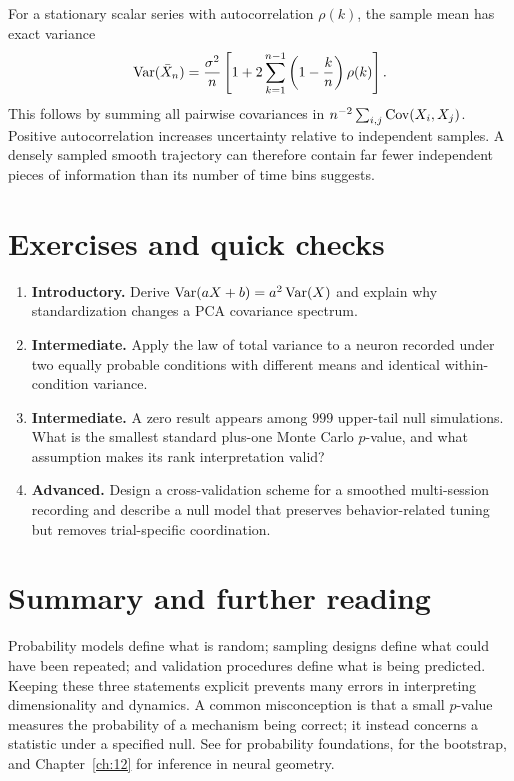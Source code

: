 For a stationary scalar series with autocorrelation \(\rho(k)\), the sample mean has exact variance
\[
\operatorname{Var}(\bar X_n)=\frac{\sigma^2}{n}
\left[1+2\sum_{k=1}^{n-1}\left(1-\frac{k}{n}\right)\rho(k)\right].
\]
This follows by summing all pairwise covariances in \(n^{-2}\sum_{i,j}\operatorname{Cov}(X_i,X_j)\). Positive autocorrelation increases uncertainty relative to independent samples. A densely sampled smooth trajectory can therefore contain far fewer independent pieces of information than its number of time bins suggests.

\section*{Exercises and quick checks}
\begin{enumerate}
\item \textbf{Introductory.} Derive \(\operatorname{Var}(aX+b)=a^2\operatorname{Var}(X)\) and explain why standardization changes a PCA covariance spectrum.
\item \textbf{Intermediate.} Apply the law of total variance to a neuron recorded under two equally probable conditions with different means and identical within-condition variance.
\item \textbf{Intermediate.} A zero result appears among \(999\) upper-tail null simulations. What is the smallest standard plus-one Monte Carlo \(p\)-value, and what assumption makes its rank interpretation valid?
\item \textbf{Advanced.} Design a cross-validation scheme for a smoothed multi-session recording and describe a null model that preserves behavior-related tuning but removes trial-specific coordination.
\end{enumerate}
\section*{Summary and further reading}
Probability models define what is random; sampling designs define what could have been repeated; and validation procedures define what is being predicted. Keeping these three statements explicit prevents many errors in interpreting dimensionality and dynamics. A common misconception is that a small \(p\)-value measures the probability of a mechanism being correct; it instead concerns a statistic under a specified null. See \citet{ev_blitzstein2019} for probability foundations, \citet{ev_efron1979} for the bootstrap, and Chapter~\ref{ch:12} for inference in neural geometry.
